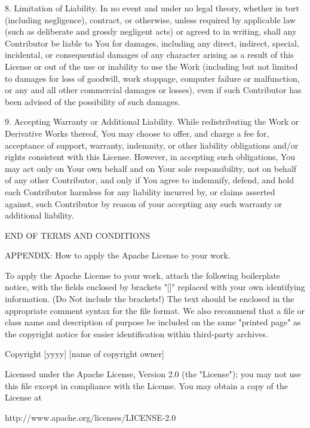 \documentclass[a4paper,twoside]{tceusermanual}
\begin{document}
   8. Limitation of Liability. In no event and under no legal theory,
      whether in tort (including negligence), contract, or otherwise,
      unless required by applicable law (such as deliberate and grossly
      negligent acts) or agreed to in writing, shall any Contributor be
      liable to You for damages, including any direct, indirect, special,
      incidental, or consequential damages of any character arising as a
      result of this License or out of the use or inability to use the
      Work (including but not limited to damages for loss of goodwill,
      work stoppage, computer failure or malfunction, or any and all
      other commercial damages or losses), even if such Contributor
      has been advised of the possibility of such damages.

   9. Accepting Warranty or Additional Liability. While redistributing
      the Work or Derivative Works thereof, You may choose to offer,
      and charge a fee for, acceptance of support, warranty, indemnity,
      or other liability obligations and/or rights consistent with this
      License. However, in accepting such obligations, You may act only
      on Your own behalf and on Your sole responsibility, not on behalf
      of any other Contributor, and only if You agree to indemnify,
      defend, and hold each Contributor harmless for any liability
      incurred by, or claims asserted against, such Contributor by reason
      of your accepting any such warranty or additional liability.

   END OF TERMS AND CONDITIONS

   APPENDIX: How to apply the Apache License to your work.

      To apply the Apache License to your work, attach the following
      boilerplate notice, with the fields enclosed by brackets "[]"
      replaced with your own identifying information. (Do Not include
      the brackets!)  The text should be enclosed in the appropriate
      comment syntax for the file format. We also recommend that a
      file or class name and description of purpose be included on the
      same "printed page" as the copyright notice for easier
      identification within third-party archives.

   Copyright [yyyy] [name of copyright owner]

   Licensed under the Apache License, Version 2.0 (the "License");
   you may not use this file except in compliance with the License.
   You may obtain a copy of the License at

       http://www.apache.org/licenses/LICENSE-2.0
\end{document}
